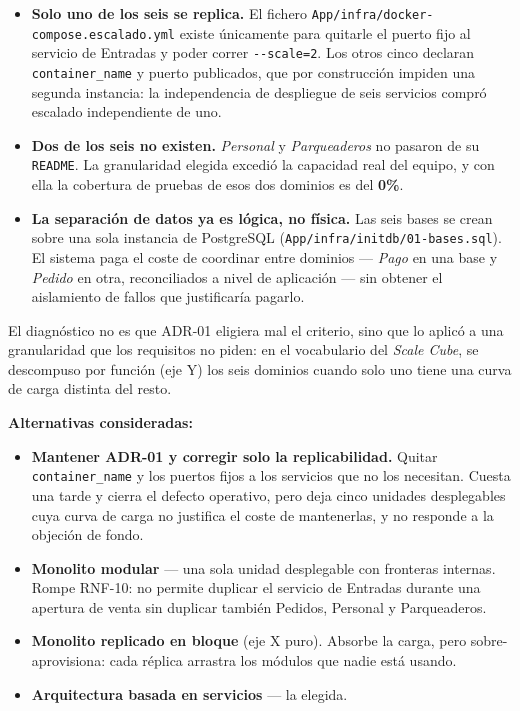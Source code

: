 \documentclass[11pt,a4paper]{article}
\begin{document}
\begin{itemize}
  \item \textbf{Solo uno de los seis se replica.} El fichero
        \texttt{App/infra/docker-compose.escalado.yml} existe únicamente para quitarle el puerto
        fijo al servicio de Entradas y poder correr \texttt{-{}-scale=2}. Los otros cinco declaran
        \texttt{container\_name} y puerto publicados, que por construcción impiden una segunda
        instancia: la independencia de despliegue de seis servicios compró escalado independiente
        de uno.
  \item \textbf{Dos de los seis no existen.} \textit{Personal} y \textit{Parqueaderos} no pasaron
        de su \texttt{README}. La granularidad elegida excedió la capacidad real del equipo, y con
        ella la cobertura de pruebas de esos dos dominios es del \textbf{0\%}.
  \item \textbf{La separación de datos ya es lógica, no física.} Las seis bases se crean sobre una
        sola instancia de PostgreSQL (\texttt{App/infra/initdb/01-bases.sql}). El sistema paga el
        coste de coordinar entre dominios --- \textit{Pago} en una base y \textit{Pedido} en otra,
        reconciliados a nivel de aplicación --- sin obtener el aislamiento de fallos que
        justificaría pagarlo.
\end{itemize}

El diagnóstico no es que ADR-01 eligiera mal el criterio, sino que lo aplicó a una granularidad que
los requisitos no piden: en el vocabulario del \textit{Scale Cube}, se descompuso por función (eje
Y) los seis dominios cuando solo uno tiene una curva de carga distinta del resto.

\textbf{Alternativas consideradas:}
\begin{itemize}
  \item \textbf{Mantener ADR-01 y corregir solo la replicabilidad.} Quitar
        \texttt{container\_name} y los puertos fijos a los servicios que no los necesitan. Cuesta
        una tarde y cierra el defecto operativo, pero deja cinco unidades desplegables cuya curva
        de carga no justifica el coste de mantenerlas, y no responde a la objeción de fondo.
  \item \textbf{Monolito modular} --- una sola unidad desplegable con fronteras internas. Rompe
        RNF-10: no permite duplicar el servicio de Entradas durante una apertura de venta sin
        duplicar también Pedidos, Personal y Parqueaderos.
  \item \textbf{Monolito replicado en bloque} (eje X puro). Absorbe la carga, pero sobre-aprovisiona:
        cada réplica arrastra los módulos que nadie está usando.
  \item \textbf{Arquitectura basada en servicios} --- la elegida.
\end{itemize}
\end{document}
